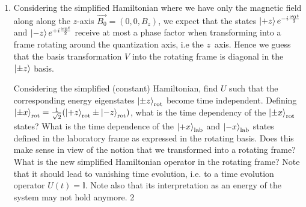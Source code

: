 \documentclass{../lab}
\begin{document}
\begin{enumerate}
\begin{enumerate}
			Solution: Starting from the Schrodinger equation in the lab frame, $i \frac{\partial}{\partial t} \ket{\psi}_\text{lab} = H_\text{lab} \ket{\psi}_\text{lab}$, we substitute in $\ket{\psi}_\text{lab} = V \ket{\psi}_\text{rot}$. We then reorganize the terms until it looks like the Schrodinger equation again, but with a different Hamiltonian.
\begin{align*}
	i\hbar \frac{\partial}{\partial t} \ket{\psi}_\text{lab} =& H_\text{lab} \ket{\psi}_\text{lab} \\
	i\hbar \frac{\partial}{\partial t} \left(V \ket{\psi}_\text{rot}\right) =& H_\text{lab} V \ket{\psi}_\text{rot} \\
	i\hbar \left(\frac{\partial}{\partial t} V \right) \ket{\psi}_\text{rot} +  i\hbar V \frac{\partial}{\partial t} \ket{\psi}_\text{rot} =& H_\text{lab} V \ket{\psi}_\text{rot} \\
	i\hbar \frac{\partial}{\partial t} \ket{\psi}_\text{rot} =& V^{-1} H_\text{lab} V \ket{\psi}_\text{rot} - i\hbar V^{-1}\left(\frac{\partial}{\partial t} V \right) \ket{\psi}_\text{rot} \\
	i\hbar \frac{\partial}{\partial t} \ket{\psi}_\text{rot} =& \left( V^{-1} H_\text{lab} V - i\hbar V^{-1}\frac{\partial}{\partial t} V \right) \ket{\psi}_\text{rot}~. 
\end{align*}
This is the Schrodinger equation with Hamiltonian $H_\text{rot} \equiv V^{-1} H_\text{lab} V - i\hbar V^{-1}\frac{\partial}{\partial t} V $.

		\item Considering the simplified Hamiltonian where 
			we have only the magnetic field along
			along the $z$-axis $\vec{B_0}=(0,0,B_z)$, we expect that the states $\ket{+z}e^{-i\frac{\omega_0 t }{2}}$ and 
			$\ket{-z} e^{+i\frac{\omega_0 t }{2}}$ receive at most a phase factor 
		        when transforming into a frame rotating around the quantization axis, i.e the $z$~axis. Hence we guess that
			the basis transformation $V$
			into the rotating frame is diagonal in the $\ket{\pm z}$ basis.

			Considering the simplified (constant) Hamiltonian, find $U$ such that the corresponding energy eigenstates $\ket{\pm z}_{\rm rot}$
			become time independent.  
			Defining $\ket{\pm x}_{\rm rot}=\frac{1}{\sqrt{2}}(\ket{+z}_{\rm rot}\pm\ket{-z}_{\rm rot})$, what is the time dependency of the $\ket{\pm x}_{\rm rot}$ states?
			What is the time dependence of the $\ket{+x}_{\rm lab}$ and $\ket{-x}_{\rm lab}$ states defined in the laboratory frame as expressed in the 
			rotating basis. Does this make sense in view of the notion that we transformed into a rotating frame? What is the new  simplified Hamiltonian operator in the rotating frame? Note that it should lead to vanishing time evolution, i.e. to a time evolution operator $U(t)=\mathbb{I}$. Note also that its interpretation as an energy of the system may not hold anymore.
			{2}
			

\end{enumerate}
\end{enumerate}
\end{document}
